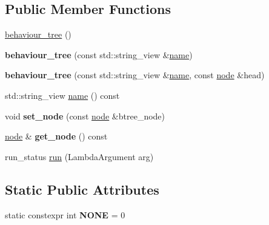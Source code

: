 \subsection*{Public Member Functions}
\begin{DoxyCompactItemize}
\item 
\hyperlink{structmods_1_1behaviour__tree_aa178fd3ed7e5ff05f955a9e055d2f894}{behaviour\+\_\+tree} ()
\item 
\mbox{\label{structmods_1_1behaviour__tree_a7c5ce0e61baa319a1bc752bf22f021ba}} 
{\bfseries behaviour\+\_\+tree} (const std\+::string\+\_\+view \&\hyperlink{structmods_1_1behaviour__tree_a5ae8521abb01c434dc3f057f8312ee66}{name})
\item 
\mbox{\label{structmods_1_1behaviour__tree_a73d8419f38560bad9e65fe58f8a28248}} 
{\bfseries behaviour\+\_\+tree} (const std\+::string\+\_\+view \&\hyperlink{structmods_1_1behaviour__tree_a5ae8521abb01c434dc3f057f8312ee66}{name}, const \hyperlink{structmods_1_1behaviour__tree__node}{node} \&head)
\item 
std\+::string\+\_\+view \hyperlink{structmods_1_1behaviour__tree_a5ae8521abb01c434dc3f057f8312ee66}{name} () const
\item 
\mbox{\label{structmods_1_1behaviour__tree_a099bd6e3e3f4b1ab25397e2f31b84c93}} 
void {\bfseries set\+\_\+node} (const \hyperlink{structmods_1_1behaviour__tree__node}{node} \&btree\+\_\+node)
\item 
\mbox{\label{structmods_1_1behaviour__tree_ad92868b69c7e3fb52ab474e7c0907260}} 
\hyperlink{structmods_1_1behaviour__tree__node}{node} \& {\bfseries get\+\_\+node} () const
\item 
run\+\_\+status \hyperlink{structmods_1_1behaviour__tree_a16325f964dcd87f8f59202bb8cde5a6d}{run} (Lambda\+Argument arg)
\end{DoxyCompactItemize}
\subsection*{Static Public Attributes}
\begin{DoxyCompactItemize}
\item 
\mbox{\label{structmods_1_1behaviour__tree_a3e0641e53548472b97405c70a79d54c3}} 
static constexpr int {\bfseries N\+O\+NE} = 0
\end{DoxyCompactItemize}


